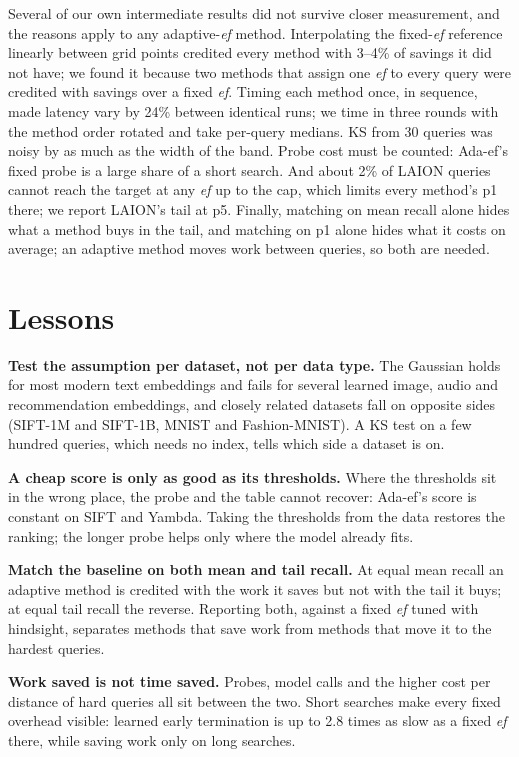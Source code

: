 \documentclass[sigconf,anonymous]{acmart}
\newcommand{\ef}{\textit{ef}}
\begin{document}
Several of our own intermediate results did not survive closer measurement, and the reasons apply
to any adaptive-\ef{} method. Interpolating the fixed-\ef{} reference linearly between grid points
credited every method with 3--4\% of savings it did not have; we found it because two methods that
assign one \ef{} to every query were credited with savings over a fixed \ef{}. Timing each method
once, in sequence, made latency vary by 24\% between identical runs; we time in three rounds with
the method order rotated and take per-query medians. KS from 30 queries was noisy by as much as the
width of the band. Probe cost must be counted: Ada-ef's fixed probe is a large share of a short
search. And about 2\% of LAION queries cannot reach the target at any \ef{} up to the cap, which
limits every method's p1 there; we report LAION's tail at p5. Finally, matching on mean recall
alone hides what a method buys in the tail, and matching on p1 alone hides what it costs on average;
an adaptive method moves work between queries, so both are needed.

\section{Lessons}

\textbf{Test the assumption per dataset, not per data type.} The Gaussian holds for most modern
text embeddings and fails for several learned image, audio and recommendation embeddings, and
closely related datasets fall on opposite sides (SIFT-1M and SIFT-1B, MNIST and Fashion-MNIST). A KS
test on a few hundred queries, which needs no index, tells which side a dataset is on.

\textbf{A cheap score is only as good as its thresholds.} Where the thresholds sit in the wrong
place, the probe and the table cannot recover: Ada-ef's score is constant on SIFT and Yambda. Taking
the thresholds from the data restores the ranking; the longer probe helps only where the model
already fits.

\textbf{Match the baseline on both mean and tail recall.} At equal mean recall an adaptive method
is credited with the work it saves but not with the tail it buys; at equal tail recall the reverse.
Reporting both, against a fixed \ef{} tuned with hindsight, separates methods that save work from
methods that move it to the hardest queries.

\textbf{Work saved is not time saved.} Probes, model calls and the higher cost per distance of hard
queries all sit between the two. Short searches make every fixed overhead visible: learned early
termination is up to 2.8 times as slow as a fixed \ef{} there, while saving work only on long
searches.
\end{document}
